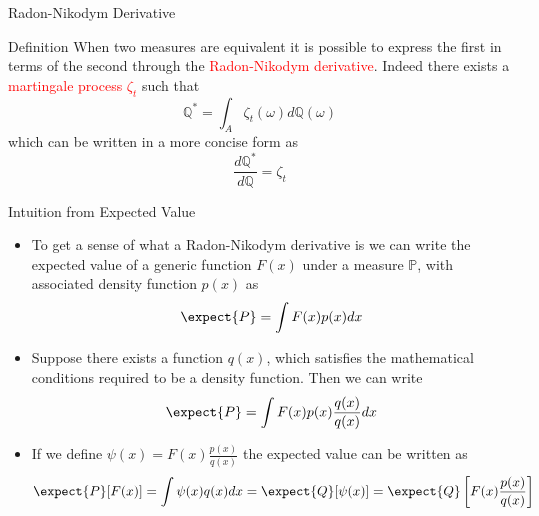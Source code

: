 \documentclass{beamer}
\begin{document}
\begin{frame}{Radon-Nikodym Derivative}
	\begin{block}{Definition}
		When two measures are equivalent it is possible to express the first in terms of the second through the \textcolor{red}{Radon-Nikodym derivative}. Indeed there exists a \textcolor{red}{martingale process $\zeta_t$} such that
		\begin{equation*}
			\mathbb{Q}^* =\int_{A} \zeta_t(\omega)d\mathbb{Q}(\omega)
		\end{equation*}
		which can be written in a more concise form as
		\begin{equation}
			\frac{d\mathbb{Q}^*}{d\mathbb{Q}} = \zeta_t
			\label{eq:radon_nikodym_der}
		\end{equation}
	\end{block}
\end{frame}

\begin{frame}{Intuition from Expected Value}
  \begin{itemize}
  \item To get a sense of what a Radon-Nikodym derivative is we can write the expected value of a generic function $F(x)$ under a measure $\mathbb{P}$, with associated density function $p(x)$ as
    \begin{equation*}
      \expect{P}=\int F(x)p(x)dx
    \end{equation*}
  \item Suppose there exists a function $q(x)$, which satisfies the mathematical conditions required to be a density function. Then we can write
    \begin{equation*}
      \expect{P}=\int F(x)p(x)\frac{q(x)}{q(x)}dx
    \end{equation*}
  \item If we define $\psi(x)=F(x)\frac{p(x)}{q(x)}$ the expected value can be written as 
    \begin{equation*}
      \expect{P}[F(x)]=\int\psi(x)q(x)dx=\expect{Q}[\psi(x)]=\expect{Q}\left[F(x)\frac{p(x)}{q(x)}\right]
    \end{equation*}
  \end{itemize}
\end{frame}
\end{document}
